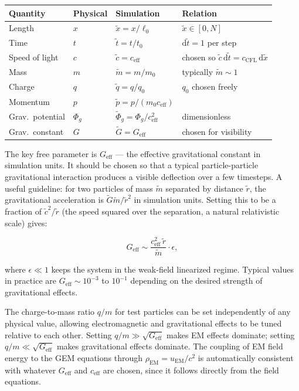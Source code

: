\documentclass[11pt,a4paper]{article}
\newcommand{\Phig}{\Phi_g}
\newcommand{\dd}{\mathrm{d}}
\begin{document}
\begin{center}
\begin{tabular}{@{}L{4cm}L{3cm}L{3cm}L{3cm}@{}}
\toprule
\textbf{Quantity} & \textbf{Physical} & \textbf{Simulation} & \textbf{Relation} \\
\midrule
Length & $x$ & $\tilde{x} = x/\ell_0$ & $\tilde{x} \in [0, N]$ \\
Time & $t$ & $\tilde{t} = t/t_0$ & $\dd\tilde{t} = 1$ per step \\
Speed of light & $c$ & $\tilde{c} = c_{\mathrm{eff}}$ & chosen so $\tilde{c}\,\dd\tilde{t} = c_{\mathrm{CFL}}\,\dd\tilde{x}$ \\
Mass & $m$ & $\tilde{m} = m/m_0$ & typically $\tilde{m} \sim 1$ \\
Charge & $q$ & $\tilde{q} = q/q_0$ & $q_0$ chosen freely \\
Momentum & $p$ & $\tilde{p} = p/(m_0 c_{\mathrm{eff}})$ & \\
Grav.\ potential & $\Phig$ & $\tilde{\Phi}_g = \Phig/c_{\mathrm{eff}}^2$ & dimensionless \\
Grav.\ constant & $G$ & $\tilde{G} = G_{\mathrm{eff}}$ & chosen for visibility \\
\bottomrule
\end{tabular}
\end{center}

The key free parameter is $G_{\mathrm{eff}}$ — the effective gravitational constant in simulation units.  It should be chosen so that a typical particle-particle gravitational interaction produces a visible deflection over a few timesteps.  A useful guideline: for two particles of mass $\tilde{m}$ separated by distance $\tilde{r}$, the gravitational acceleration is $\tilde{G}\tilde{m}/\tilde{r}^2$ in simulation units.  Setting this to be a fraction of $\tilde{c}^2/\tilde{r}$ (the speed squared over the separation, a natural relativistic scale) gives:

\begin{equation}
  G_{\mathrm{eff}} \sim \frac{c_{\mathrm{eff}}^2\,\tilde{r}}{\tilde{m}} \cdot \epsilon,
\end{equation}

where $\epsilon \ll 1$ keeps the system in the weak-field linearized regime.  Typical values in practice are $G_{\mathrm{eff}} \sim 10^{-3}$ to $10^{-1}$ depending on the desired strength of gravitational effects.

The charge-to-mass ratio $q/m$ for test particles can be set independently of any physical value, allowing electromagnetic and gravitational effects to be tuned relative to each other.  Setting $q/m \gg \sqrt{G_{\mathrm{eff}}}$ makes EM effects dominate; setting $q/m \ll \sqrt{G_{\mathrm{eff}}}$ makes gravitational effects dominate.  The coupling of EM field energy to the GEM equations through $\rho_{\mathrm{EM}} = u_{\mathrm{EM}}/c^2$ is automatically consistent with whatever $G_{\mathrm{eff}}$ and $c_{\mathrm{eff}}$ are chosen, since it follows directly from the field equations.
\end{document}
